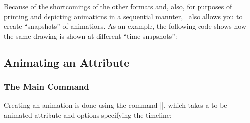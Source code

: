 Because of the shortcomings of the other formats and, also, for
purposes of printing and depicting animations in a sequential mannter,
\pgfname\ also allows you to create ``snapshots'' of animations. As an
example, the following code shows how the same drawing is shown at
different ``time snapshots'':

\begin{codeexample}[width=3.9cm]
\tikz [make snapshot of=0.5s, animate me = { :rotate = { 0s = "0", 2s = "90" } }]
  { \node [draw=blue, very thick] {\pgfname}; }
\tikz [make snapshot of=1s, animate me = { :rotate = { 0s = "0", 2s = "90" } }]
  { \node [draw=blue, very thick] {\pgfname}; }
\tikz [make snapshot of=1.5s, animate me = { :rotate = { 0s = "0", 2s = "90" } }]
  { \node [draw=blue, very thick] {\pgfname}; }
\tikz [make snapshot of=2s, animate me = { :rotate = { 0s = "0", 2s = "90" } }]
  { \node [draw=blue, very thick] {\pgfname}; }
\end{codeexample}


\subsection{Animating an Attribute}

\subsubsection{The Main Command}

Creating an animation is done using the command
|\pgfanimateattribute|, which takes a to-be-animated attribute and
options specifying the timeline:


